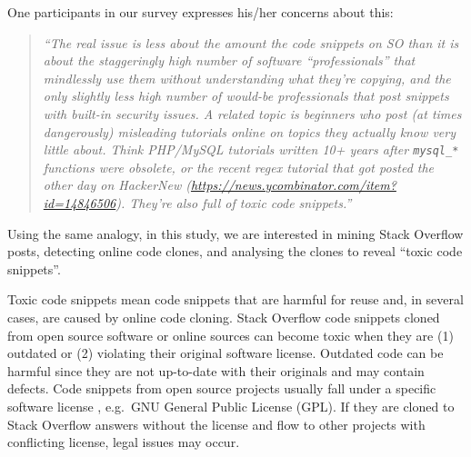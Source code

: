 \documentclass[10pt,journal,compsoc]{IEEEtran}
\begin{document}
One participants in our survey expresses his/her concerns about this:

\begin{quote}
	\textit{``The real issue is less about the amount the code snippets
	on SO than it is about the staggeringly high number of software
	``professionals'' that mindlessly use them without understanding what they're
	copying, and the only slightly less high number of would-be professionals that
	post snippets with built-in security issues.  A related topic is beginners who
	post (at times dangerously) misleading tutorials online on topics they actually
	know very little about. Think PHP/MySQL tutorials written 10+ years after
	\texttt{mysql\_*} functions were obsolete, or the recent regex tutorial that
	got posted the other day on HackerNew
	(\url{https://news.ycombinator.com/item?id=14846506}). They're also full of
	toxic code snippets.''}
\end{quote}

Using the same analogy, in this study, we are interested in mining Stack
Overflow posts, detecting online code clones, and analysing the clones to reveal
``toxic code snippets''.

Toxic code snippets mean code snippets that are harmful for reuse and, in
several cases, are caused by online code cloning. Stack Overflow code snippets
cloned from open source software or online sources can become toxic when they
are (1) outdated or (2) violating their original software license. Outdated code
can be harmful since they are not up-to-date with their originals and may
contain defects. Code snippets from open source projects usually fall under a
specific software license , e.g.~GNU General Public License (GPL). If they are
cloned to Stack Overflow answers without the license and flow to other projects
with conflicting license, legal issues may occur.
\end{document}
